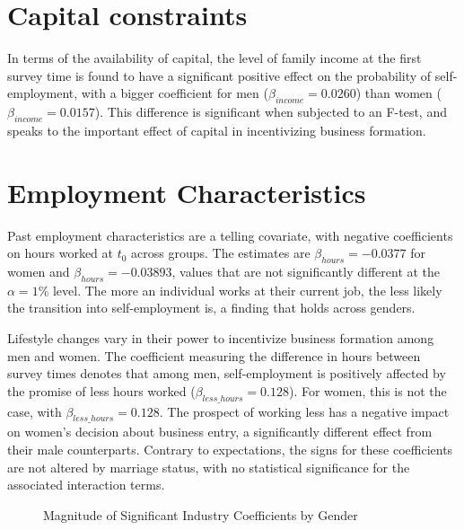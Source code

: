 \section{Capital constraints}

In terms of the availability of capital, the level of family income at the first survey time is found to have a significant positive effect on the probability of self-employment, with a bigger coefficient for men ($\beta_{income} = 0.0260$) than women ($\beta_{income} = 0.0157$). This difference is significant when subjected to an F-test, and speaks to the important effect of capital in incentivizing business formation.

\section{Employment Characteristics}

Past employment characteristics are a telling covariate, with negative coefficients on hours worked at $t_0$ across groups. The estimates are $\beta_{hours} = -0.0377$ for women and $\beta_{hours} = -0.03893$, values that are not significantly different at the $\alpha = 1 \%$ level. The more an individual works at their current job, the less likely the transition into self-employment is, a finding that holds across genders.

Lifestyle changes vary in their power to incentivize business formation among men and women. The coefficient measuring the difference in hours between survey times denotes that among men, self-employment is positively affected by the promise of less hours worked ($\beta_{less\_hours} = 0.128$). For women, this is not the case, with $\beta_{less\_hours} = 0.128$. The prospect of working less has a negative impact on women’s decision about business entry, a significantly different effect from their male counterparts. Contrary to expectations, the signs for these coefficients are not altered by marriage status, with no statistical significance for the associated interaction terms. 

\begin{figure}[hbtp]
    \caption{Magnitude of Significant Industry Coefficients by Gender} 
\end{figure}

